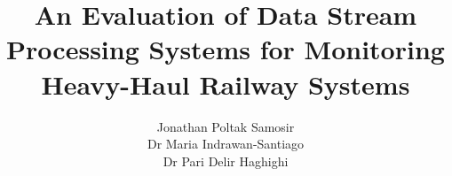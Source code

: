 \title{An Evaluation of Data Stream Processing Systems for Monitoring Heavy-Haul Railway Systems}


\author{Jonathan Poltak Samosir\\
        Dr Maria Indrawan-Santiago\\
        Dr Pari Delir Haghighi}







\subject{Realtime Big Data Processing} 
